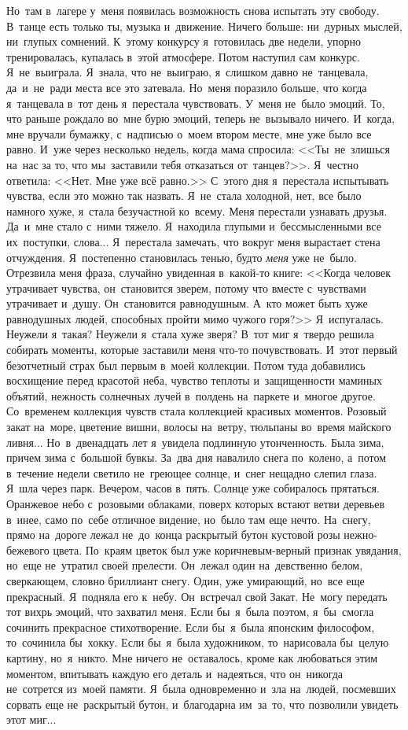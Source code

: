Но~там в~лагере у~меня появилась возможность снова испытать эту свободу.
В~танце есть только ты, музыка и~движение.
Ничего больше: ни~дурных мыслей, ни~глупых сомнений.
К~этому конкурсу я~готовилась две недели, упорно тренировалась, купалась в~этой атмосфере.
Потом наступил сам конкурс.
Я~не~выиграла.
Я~знала, что не~выиграю, я~слишком давно не~танцевала, да~и~не~ради места все это затевала.
Но~меня поразило больше, что когда я~танцевала в~тот день я~перестала чувствовать.
У~меня не~было эмоций.
То, что раньше рождало во~мне бурю эмоций, теперь не~вызывало ничего.
И~когда, мне вручали бумажку, с~надписью о~моем втором месте, мне уже было все равно.
И~уже через несколько недель, когда мама спросила: <<Ты~не~злишься на~нас за то, что мы~заставили тебя отказаться от~танцев?>>.
Я~честно ответила: <<Нет.
Мне уже всё равно.>>
С~этого дня я~перестала испытывать чувства, если это можно так назвать.
Я~не~стала холодной, нет, все было намного хуже, я~стала безучастной ко~всему.
Меня перестали узнавать друзья.
Да~и~мне стало с~ними тяжело.
Я~находила глупыми и~бессмысленными все их~поступки, слова... Я~перестала замечать, что вокруг меня вырастает стена отчуждения.
Я~постепенно становилась тенью, будто \textit{меня} уже не~было.
Отрезвила меня фраза, случайно увиденная в~какой-то книге: <<Когда человек утрачивает чувства, он~становится зверем, потому что вместе с~чувствами утрачивает и~душу.
Он~становится равнодушным.
А~кто может быть хуже равнодушных людей, способных пройти мимо чужого горя?>>
Я~испугалась.
Неужели я~такая? Неужели я~стала хуже зверя? В~тот миг я~твердо решила собирать моменты, которые заставили меня что-то почувствовать.
И~этот первый безотчетный страх был первым в~моей коллекции.
Потом туда добавились восхищение перед красотой неба, чувство теплоты и~защищенности маминых объятий, нежность солнечных лучей в~полдень на~паркете и~многое другое.
Со~временем коллекция чувств стала коллекцией красивых моментов.
Розовый закат на~море, цветение вишни, волосы на~ветру, тюльпаны во~время майского ливня... Но~в~двенадцать лет я~увидела подлинную утонченность.
Была зима, причем зима с~большой бувкы.
За~два дня навалило снега по~колено, а~потом в~течение недели светило не~греющее солнце, и~снег нещадно слепил глаза.
Я~шла через парк.
Вечером, часов в~пять.
Солнце уже собиралось прятаться.
Оранжевое небо с~розовыми облаками, поверх которых встают ветви деревьев в~инее, само по~себе отличное видение, но~было там еще нечто.
На~снегу, прямо на~дороге лежал не~до~конца раскрытый бутон кустовой розы нежно-бежевого цвета.
По~краям цветок был уже коричневым-верный признак увядания, но~еще не~утратил своей прелести.
Он~лежал один на~девственно белом, сверкающем, словно бриллиант снегу.
Один, уже умирающий, но~все еще прекрасный.
Я~подняла его к~небу.
Он~встречал свой Закат.
Не~могу передать тот вихрь эмоций, что захватил меня.
Если бы~я~была поэтом, я~бы~смогла сочинить прекрасное стихотворение.
Если бы~я~была японским философом, то~сочинила бы~хокку.
Если бы~я~была художником, то~нарисовала бы~целую картину, но~я~никто.
Мне ничего не~оставалось, кроме как любоваться этим моментом, впитывать каждую его деталь и~надеяться, что он~никогда не~сотрется из~моей памяти.
Я~была одновременно и~зла на~людей, посмевших сорвать еще не~раскрытый бутон, и~благодарна им~за~то, что позволили увидеть этот миг...

